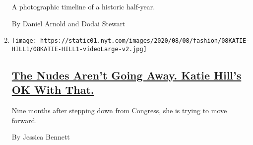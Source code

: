 \begin{enumerate}
  A photographic timeline of a historic half-year.

  By Daniel Arnold and Dodai Stewart
\item
  \texttt{[image: https://static01.nyt.com/images/2020/08/08/fashion/08KATIE-HILL1/08KATIE-HILL1-videoLarge-v2.jpg]}

  \hypertarget{the-nudes-arent-going-away-katie-hills-ok-with-that}{%
  \subsection{\texorpdfstring{\href{/2020/08/08/style/katie-hill-she-will-rise-revenge-porn.html}{The
  Nudes Aren't Going Away. Katie Hill's OK With
  That.}}{The Nudes Aren't Going Away. Katie Hill's OK With That.}}\label{the-nudes-arent-going-away-katie-hills-ok-with-that}}

  Nine months after stepping down from Congress, she is trying to move
  forward.

  By Jessica Bennett
\end{enumerate}

